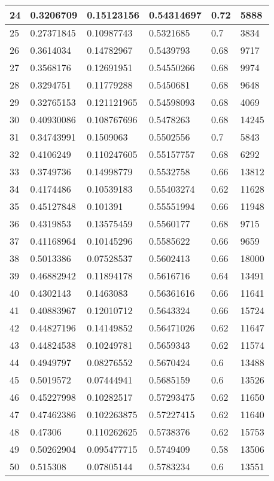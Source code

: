 \begin{longtable}{|l|l|l|l|l|l|}
24 & 0.3206709 & 0.15123156 & 0.54314697 & 0.72 & 5888 \\ \hline 
25 & 0.27371845 & 0.10987743 & 0.5321685 & 0.7 & 3834 \\ \hline 
26 & 0.3614034 & 0.14782967 & 0.5439793 & 0.68 & 9717 \\ \hline 
27 & 0.3568176 & 0.12691951 & 0.54550266 & 0.68 & 9974 \\ \hline 
28 & 0.3294751 & 0.11779288 & 0.5450681 & 0.68 & 9648 \\ \hline 
29 & 0.32765153 & 0.121121965 & 0.54598093 & 0.68 & 4069 \\ \hline 
30 & 0.40930086 & 0.108767696 & 0.5478263 & 0.68 & 14245 \\ \hline 
31 & 0.34743991 & 0.1509063 & 0.5502556 & 0.7 & 5843 \\ \hline 
32 & 0.4106249 & 0.110247605 & 0.55157757 & 0.68 & 6292 \\ \hline 
33 & 0.3749736 & 0.14998779 & 0.5532758 & 0.66 & 13812 \\ \hline 
34 & 0.4174486 & 0.10539183 & 0.55403274 & 0.62 & 11628 \\ \hline 
35 & 0.45127848 & 0.101391 & 0.55551994 & 0.66 & 11948 \\ \hline 
36 & 0.4319853 & 0.13575459 & 0.5560177 & 0.68 & 9715 \\ \hline 
37 & 0.41168964 & 0.10145296 & 0.5585622 & 0.66 & 9659 \\ \hline 
38 & 0.5013386 & 0.07528537 & 0.5602413 & 0.66 & 18000 \\ \hline 
39 & 0.46882942 & 0.11894178 & 0.5616716 & 0.64 & 13491 \\ \hline 
40 & 0.4302143 & 0.1463083 & 0.56361616 & 0.66 & 11641 \\ \hline 
41 & 0.40883967 & 0.12010712 & 0.5643324 & 0.66 & 15724 \\ \hline 
42 & 0.44827196 & 0.14149852 & 0.56471026 & 0.62 & 11647 \\ \hline 
43 & 0.44824538 & 0.10249781 & 0.5659343 & 0.62 & 11574 \\ \hline 
44 & 0.4949797 & 0.08276552 & 0.5670424 & 0.6 & 13488 \\ \hline 
45 & 0.5019572 & 0.07444941 & 0.5685159 & 0.6 & 13526 \\ \hline 
46 & 0.45227998 & 0.10282517 & 0.57293475 & 0.62 & 11650 \\ \hline 
47 & 0.47462386 & 0.102263875 & 0.57227415 & 0.62 & 11640 \\ \hline 
48 & 0.47306 & 0.110262625 & 0.5738376 & 0.62 & 15753 \\ \hline 
49 & 0.50262904 & 0.095477715 & 0.5749409 & 0.58 & 13506 \\ \hline 
50 & 0.515308 & 0.07805144 & 0.5783234 & 0.6 & 13551 \\ \hline 
\end{longtable}